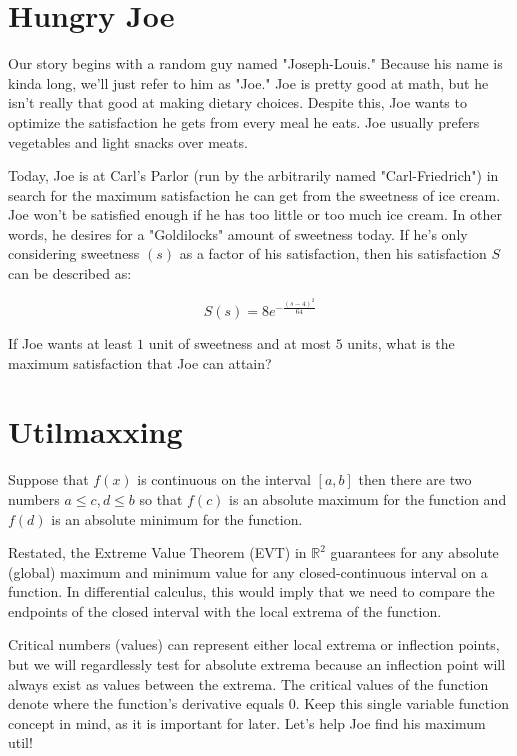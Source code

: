 \setcounter{chapter}{0}
\chapter{Hungry Joe}
Our story begins with a random guy named "Joseph-Louis."
Because his name is kinda long, we'll just refer to him as "Joe."
Joe is pretty good at math, but he isn't really that good at making dietary choices.
Despite this, Joe wants to optimize the satisfaction he gets from every meal he eats.
Joe usually prefers vegetables and light snacks over meats.

Today, Joe is at Carl's Parlor (run by the arbitrarily named "Carl-Friedrich") in search for the maximum satisfaction he can get from the sweetness of ice cream.
Joe won't be satisfied enough if he has too little or too much ice cream.
In other words, he desires for a "Goldilocks" amount of sweetness today.
If he's only considering sweetness $(s)$ as a factor of his satisfaction, then his satisfaction $S$ can be described as:\par
\LARGE
\begin{equation}
	S(s) = 8e^{-\frac{(s-4)^2}{64}}
\end{equation}
\normalsize
\begin{eg}
	If Joe wants at least $1$ unit of sweetness and at most $5$ units, what is the maximum satisfaction that Joe can attain?
\end{eg}
\setcounter{chapter}{1}
\chapter{Utilmaxxing}
\begin{theorem}
	Suppose that \(f\left( x \right)\) is continuous on the interval \(\left[ {a,b} \right]\) then there are two numbers \(a \le c,d \le b\) so that \(f\left( c \right)\) is an absolute maximum for the function and \(f\left( d \right)\) is an absolute minimum for the function.
\end{theorem}

Restated, the Extreme Value Theorem (EVT) in $\mathbb{R}^2$ guarantees for any absolute (global) maximum and minimum value for any closed-continuous interval on a function.
In differential calculus, this would imply that we need to compare the endpoints of the closed interval with the local extrema of the function.

Critical numbers (values) can represent either local extrema or inflection points, but we will regardlessly test for absolute extrema because an inflection point will always exist as values between the extrema.
The critical values of the function denote where the function's derivative equals $0$.
Keep this single variable function concept in mind, as it is important for later.
Let's help Joe find his maximum util!

